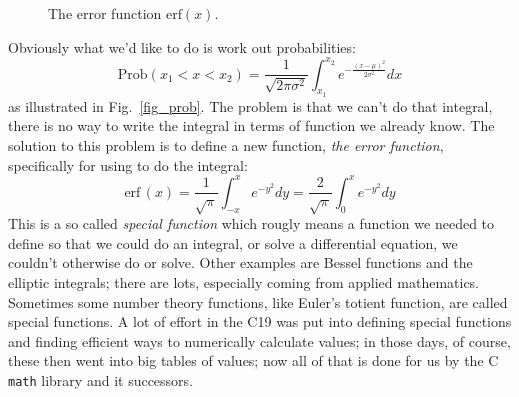 \documentclass[11pt,a4paper]{scrartcl}
\begin{document}
\begin{figure}[tb]
\begin{center}

\end{center}
\caption{The error function $\mbox{erf}(x)$.\label{fig_erf}}
\end{figure}


Obviously what we'd like to do is work out probabilities:
\begin{equation}
\mbox{Prob}(x_1<x<x_2)=\frac{1}{\sqrt{2\pi\sigma^2}}\int_{x_1}^{x_2} e^{-\frac{(x-\mu)^2}{2\sigma^2}}dx
\end{equation}
as illustrated in Fig.~\ref{fig_prob}. The problem is that we can't
do that integral, there is no way to write the integral in terms of
function we already know. The solution to this problem is to define a
new function, \textsl{the error function}, specifically for using to
do the integral:
\begin{equation}
\mbox{erf}\,(x)=\frac{1}{\sqrt{\pi}}\int_{-x}^xe^{-y^2}dy=\frac{2}{\sqrt{\pi}}\int_0^xe^{-y^2}dy
\end{equation}
This is a so called \textsl{special function} which rougly means a
function we needed to define so that we could do an integral, or solve
a differential equation, we couldn't otherwise do or solve. Other
examples are Bessel functions and the elliptic integrals; there are
lots, especially coming from applied mathematics. Sometimes some
number theory functions, like Euler's totient function, are called
special functions. A lot of effort in the C19 was put into defining
special functions and finding efficient ways to numerically calculate
values; in those days, of course, these then went into big tables of
values; now all of that is done for us by the C \texttt{math} library
and it successors.
\end{document}

